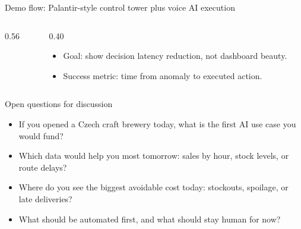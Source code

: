 \documentclass[aspectratio=169,10pt]{beamer}
\begin{document}
\begin{frame}{Demo flow: Palantir-style control tower plus voice AI execution}
  \begin{columns}[T,onlytextwidth]
    \begin{column}{0.56\textwidth}
    \end{column}
    \begin{column}{0.40\textwidth}
      \footnotesize
      \begin{itemize}[<+->]\setlength\itemsep{0.8em}
        \item Goal: show decision latency reduction, not dashboard beauty.
        \item Success metric: time from anomaly to executed action.
      \end{itemize}
    \end{column}
  \end{columns}
\end{frame}

\begin{frame}{Open questions for discussion}
  \begin{itemize}[<+->]\setlength\itemsep{1.2em}
    \item If you opened a Czech craft brewery today, what is the first AI use case you would fund?
    \item Which data would help you most tomorrow: sales by hour, stock levels, or route delays?
    \item Where do you see the biggest avoidable cost today: stockouts, spoilage, or late deliveries?
    \item What should be automated first, and what should stay human for now?
  \end{itemize}
\end{frame}
\end{document}
